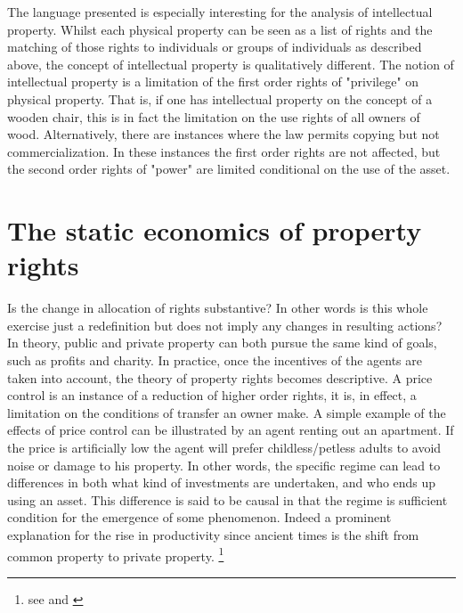 \documentclass[12pt]{report}
\numberwithin{equation}{section}
\begin{document}
The language presented is especially interesting for the analysis of intellectual property. Whilst each physical property can be seen as a list of rights and the matching of those rights to individuals or groups of individuals as described above, the concept of intellectual property is qualitatively different. The notion of intellectual property is a limitation of the first order rights of "privilege" on physical property. That is, if one has intellectual property on the concept of a wooden chair, this is in fact the limitation on the use rights of all owners of wood. Alternatively, there are instances where the law permits copying but not commercialization. In these instances the first order rights are not affected, but the second order rights of "power" are limited conditional on the use of the asset.

\section{The static economics of property rights}\label{static}

Is the change in allocation of rights substantive? In other words is this whole exercise just a redefinition but does not imply any changes in resulting actions? In theory, public and private property can both pursue the same kind of goals, such as profits and charity. In practice, once the incentives of the agents are taken into account, the theory of property rights becomes descriptive. A price control is an instance of a reduction of higher order rights, it is, in effect, a limitation on the conditions of transfer an owner make. A simple example of the effects of price control can be illustrated by an agent renting out an apartment. If the price is artificially low the agent will prefer childless/petless adults to avoid noise or damage to his property. In other words, the specific regime can lead to differences in both what kind of investments are undertaken, and who ends up using an asset. This difference is said to be causal in that the regime is sufficient condition for the emergence of some phenomenon. Indeed a prominent explanation for the rise in productivity since ancient times is the shift from common property to private property. \footnote{see \cite{anderson1983privatizing} and \cite{north1973rise}}
\end{document}
